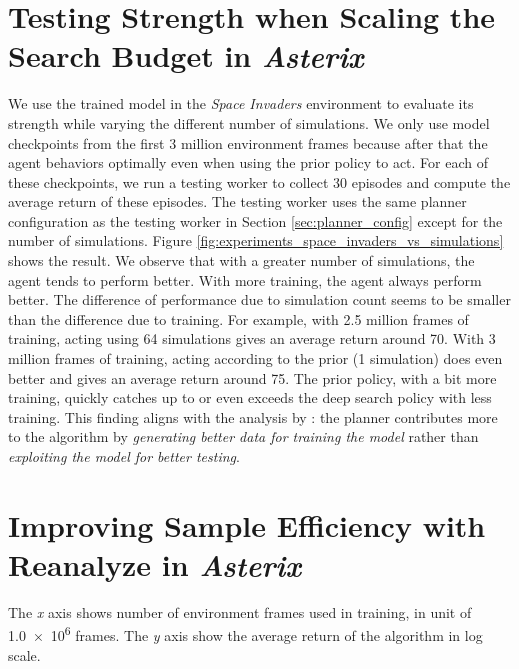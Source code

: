\section{Testing Strength when Scaling the Search Budget in \textit{Asterix}}
We use the trained \moozi model in the \textit{Space Invaders} environment to evaluate its strength while varying the different number of simulations.
We only use model checkpoints from the first 3 million environment frames because after that the agent behaviors optimally even when using the prior policy to act.
For each of these checkpoints, we run a testing worker to collect 30 episodes and compute the average return of these episodes.
The testing worker uses the same planner configuration as the testing worker in Section \ref{sec:planner_config} except for the number of simulations.
Figure \ref{fig:experiments_space_invaders_vs_simulations} shows the result.
We observe that with a greater number of simulations, the agent tends to perform better.
With more training, the agent always perform better.
The difference of performance due to simulation count seems to be smaller than the difference due to training.
For example, with 2.5 million frames of training, acting using 64 simulations gives an average return around 70.
With 3 million frames of training, acting according to the prior (1 simulation) does even better and gives an average return around 75.
The prior policy, with a bit more training, quickly catches up to or even exceeds the deep search policy with less training.
This finding aligns with the analysis by \citeauthor{RolePlanningModelbased_Hamrick.Friesen.ea_2022} \cite{RolePlanningModelbased_Hamrick.Friesen.ea_2022}:
the planner contributes more to the algorithm by \textit{generating better data for training the model} rather than \textit{exploiting the model for better testing}.


\section{Improving Sample Efficiency with Reanalyze in \textit{Asterix}} \label{sec:exp:re}

{
    The \textit{x} axis shows number of environment frames used in training, in unit of \num{1.0e6} frames.
    The \textit{y} axis show the average return of the algorithm in log scale.
}

